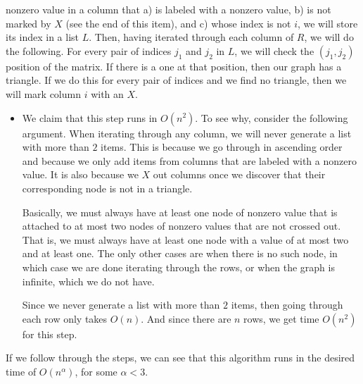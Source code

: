 \documentclass{article}
\begin{document}
\begin{description}
\begin{enumerate}
                nonzero value in a column
                that a) is labeled with a nonzero value, b) is not marked by $X$
                (see the end of this item), and c) whose
                index is not $i$, we will store its index in a list $L$. Then, having
                iterated through each column of $R$, we will do the following.
                For every pair of indices
                $j_1$ and $j_2$ in $L$, we will check the $(j_1,j_2)$ position of
                the matrix. If there is a one at that position, then our graph
                has a triangle. If we do this for every pair of indices and we
                find no triangle, then we will mark column $i$ with an $X$.
                \begin{itemize}
                    \item We claim that this step runs in $O(n^2)$. To see why,
                        consider the following argument. When iterating through
                        any column, we will never generate a list with more than
                        $2$ items. This is because we go through in ascending
                        order and because we only add items from columns that
                        are labeled with a nonzero value. It is also because we
                        $X$ out columns once we discover that their
                        corresponding node is not in a triangle.

                        Basically, we must always have
                        at least one node of nonzero value that is
                        attached to at most two nodes of nonzero values that are
                        not crossed out. That is, we must always have at least
                        one node with a value of at most two and at least
                        one. The
                        only other cases are when there is no such node,
                        in which case we are done iterating through the rows, or when the graph is
                        infinite, which we do not have.

                        Since we never generate a list with more than $2$ items,
                        then going through each row only takes $O(n)$. And since
                        there are $n$ rows, we get time
                        $O(n^2)$ for this step.
                \end{itemize}
        \end{enumerate}

        If we follow through the steps, we can see that this algorithm runs in
        the desired time of $O(n^{\alpha})$, for some $\alpha < 3$.


\end{description}
\end{document}

